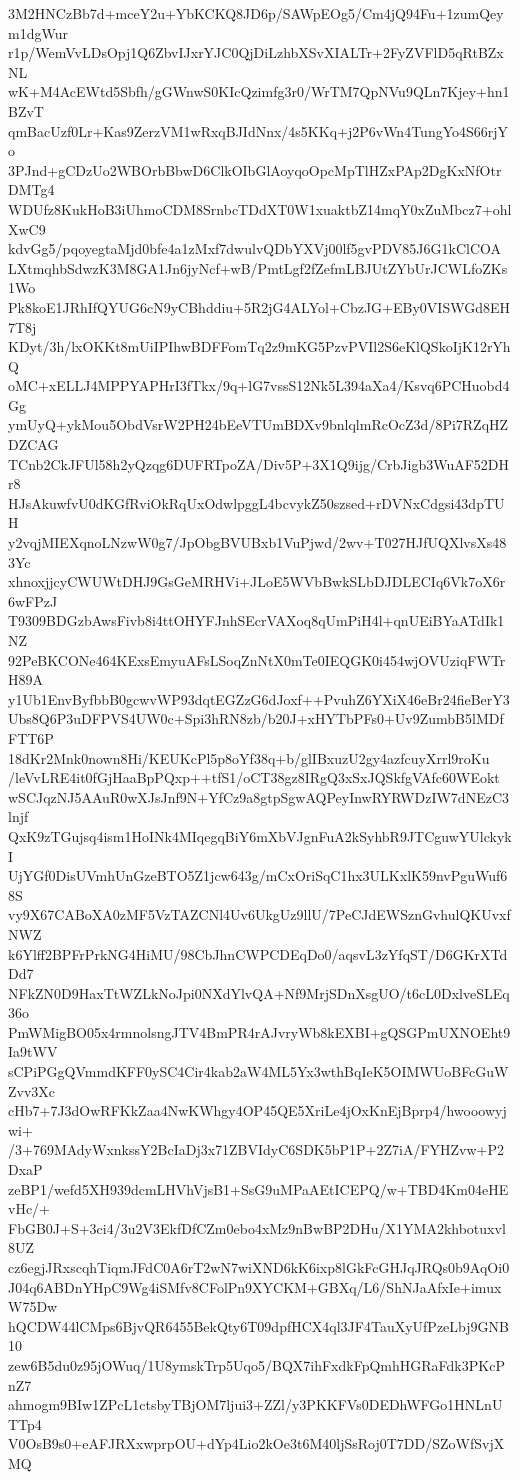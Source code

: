 3M2HNCzBb7d+mceY2u+YbKCKQ8JD6p/SAWpEOg5/Cm4jQ94Fu+1zumQeym1dgWur
r1p/WemVvLDsOpj1Q6ZbvIJxrYJC0QjDiLzhbXSvXIALTr+2FyZVFlD5qRtBZxNL
wK+M4AcEWtd5Sbfh/gGWnwS0KIcQzimfg3r0/WrTM7QpNVu9QLn7Kjey+hn1BZvT
qmBacUzf0Lr+Kas9ZerzVM1wRxqBJIdNnx/4s5KKq+j2P6vWn4TungYo4S66rjYo
3PJnd+gCDzUo2WBOrbBbwD6ClkOIbGlAoyqoOpcMpTlHZxPAp2DgKxNfOtrDMTg4
WDUfz8KukHoB3iUhmoCDM8SrnbcTDdXT0W1xuaktbZ14mqY0xZuMbcz7+ohlXwC9
kdvGg5/pqoyegtaMjd0bfe4a1zMxf7dwulvQDbYXVj00lf5gvPDV85J6G1kClCOA
LXtmqhbSdwzK3M8GA1Jn6jyNcf+wB/PmtLgf2fZefmLBJUtZYbUrJCWLfoZKs1Wo
Pk8koE1JRhIfQYUG6cN9yCBhddiu+5R2jG4ALYol+CbzJG+EBy0VISWGd8EH7T8j
KDyt/3h/lxOKKt8mUiIPIhwBDFFomTq2z9mKG5PzvPVIl2S6eKlQSkoIjK12rYhQ
oMC+xELLJ4MPPYAPHrI3fTkx/9q+lG7vssS12Nk5L394aXa4/Ksvq6PCHuobd4Gg
ymUyQ+ykMou5ObdVsrW2PH24bEeVTUmBDXv9bnlqlmRcOcZ3d/8Pi7RZqHZDZCAG
TCnb2CkJFUl58h2yQzqg6DUFRTpoZA/Div5P+3X1Q9ijg/CrbJigb3WuAF52DHr8
HJsAkuwfvU0dKGfRviOkRqUxOdwlpggL4bcvykZ50szsed+rDVNxCdgsi43dpTUH
y2vqjMIEXqnoLNzwW0g7/JpObgBVUBxb1VuPjwd/2wv+T027HJfUQXlvsXs483Yc
xhnoxjjcyCWUWtDHJ9GsGeMRHVi+JLoE5WVbBwkSLbDJDLECIq6Vk7oX6r6wFPzJ
T9309BDGzbAwsFivb8i4ttOHYFJnhSEcrVAXoq8qUmPiH4l+qnUEiBYaATdIk1NZ
92PeBKCONe464KExsEmyuAFsLSoqZnNtX0mTe0IEQGK0i454wjOVUziqFWTrH89A
y1Ub1EnvByfbbB0gcwvWP93dqtEGZzG6dJoxf++PvuhZ6YXiX46eBr24fieBerY3
Ubs8Q6P3uDFPVS4UW0c+Spi3hRN8zb/b20J+xHYTbPFs0+Uv9ZumbB5lMDfFTT6P
18dKr2Mnk0nown8Hi/KEUKcPl5p8oYf38q+b/glIBxuzU2gy4azfcuyXrrl9roKu
/leVvLRE4it0fGjHaaBpPQxp++tfS1/oCT38gz8IRgQ3xSxJQSkfgVAfc60WEokt
wSCJqzNJ5AAuR0wXJsJnf9N+YfCz9a8gtpSgwAQPeyInwRYRWDzIW7dNEzC3lnjf
QxK9zTGujsq4ism1HoINk4MIqegqBiY6mXbVJgnFuA2kSyhbR9JTCguwYUlckykI
UjYGf0DisUVmhUnGzeBTO5Z1jcw643g/mCxOriSqC1hx3ULKxlK59nvPguWuf68S
vy9X67CABoXA0zMF5VzTAZCNl4Uv6UkgUz9llU/7PeCJdEWSznGvhulQKUvxfNWZ
k6Ylff2BPFrPrkNG4HiMU/98CbJhnCWPCDEqDo0/aqsvL3zYfqST/D6GKrXTdDd7
NFkZN0D9HaxTtWZLkNoJpi0NXdYlvQA+Nf9MrjSDnXsgUO/t6cL0DxlveSLEq36o
PmWMigBO05x4rmnolsngJTV4BmPR4rAJvryWb8kEXBI+gQSGPmUXNOEht9Ia9tWV
sCPiPGgQVmmdKFF0ySC4Cir4kab2aW4ML5Yx3wthBqIeK5OIMWUoBFcGuWZvv3Xc
cHb7+7J3dOwRFKkZaa4NwKWhgy4OP45QE5XriLe4jOxKnEjBprp4/hwooowyjwi+
/3+769MAdyWxnkssY2BcIaDj3x71ZBVIdyC6SDK5bP1P+2Z7iA/FYHZvw+P2DxaP
zeBP1/wefd5XH939dcmLHVhVjsB1+SsG9uMPaAEtICEPQ/w+TBD4Km04eHEvHc/+
FbGB0J+S+3ci4/3u2V3EkfDfCZm0ebo4xMz9nBwBP2DHu/X1YMA2khbotuxvl8UZ
cz6egjJRxscqhTiqmJFdC0A6rT2wN7wiXND6kK6ixp8lGkFcGHJqJRQs0b9AqOi0
J04q6ABDnYHpC9Wg4iSMfv8CFolPn9XYCKM+GBXq/L6/ShNJaAfxIe+imuxW75Dw
hQCDW44lCMps6BjvQR6455BekQty6T09dpfHCX4ql3JF4TauXyUfPzeLbj9GNB10
zew6B5du0z95jOWuq/1U8ymskTrp5Uqo5/BQX7ihFxdkFpQmhHGRaFdk3PKcPnZ7
ahmogm9BIw1ZPcL1ctsbyTBjOM7ljui3+ZZl/y3PKKFVs0DEDhWFGo1HNLnUTTp4
V0OsB9s0+eAFJRXxwprpOU+dYp4Lio2kOe3t6M40ljSsRoj0T7DD/SZoWfSvjXMQ
